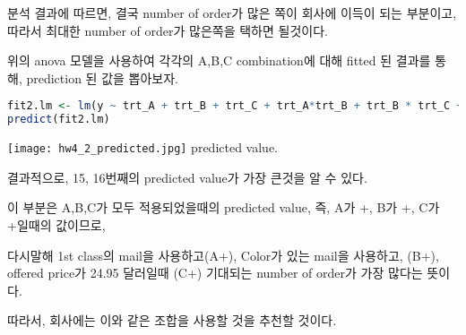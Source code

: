 \documentclass{article}
\begin{document}
분석 결과에 따르면, 결국 number of order가 많은 쪽이 회사에 이득이 되는 부분이고, 따라서 최대한 number of order가 많은쪽을 택하면 될것이다.

위의 anova 모델을 사용하여 각각의 A,B,C combination에 대해 fitted 된 결과를 통해, prediction 된 값을 뽑아보자.

 \begin{lstlisting}[language=R]
fit2.lm <- lm(y ~ trt_A + trt_B + trt_C + trt_A*trt_B + trt_B * trt_C + trt_A * trt_C + trt_A * trt_B * trt_C, data = df2)
predict(fit2.lm)
\end{lstlisting}

\begin{center}
    \texttt{[image: hw4\_2\_predicted.jpg]}
predicted value.
\end{center} 

결과적으로, 15, 16번째의 predicted value가 가장 큰것을 알 수 있다.

이 부분은 A,B,C가 모두 적용되었을때의 predicted value, 즉, A가 +, B가 +, C가 +일때의 값이므로,

다시말해 1st class의 mail을 사용하고(A+), Color가 있는 mail을 사용하고, (B+), offered price가 24.95 달러일때 (C+)
기대되는 number of order가 가장 많다는 뜻이다.

따라서, 회사에는 이와 같은 조합을 사용할 것을 추천할 것이다. 
\end{document}
